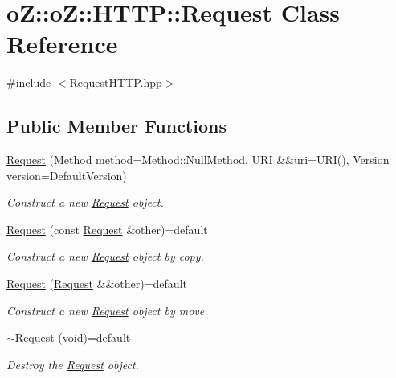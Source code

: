 \hypertarget{classo_z_1_1o_z_1_1_h_t_t_p_1_1_request}{}\section{oZ\+::oZ\+::H\+T\+TP\+::Request Class Reference}
\label{classo_z_1_1o_z_1_1_h_t_t_p_1_1_request}


{\ttfamily \#include $<$Request\+H\+T\+T\+P.\+hpp$>$}

\subsection*{Public Member Functions}
\begin{DoxyCompactItemize}
\item 
\mbox{\hyperlink{classo_z_1_1o_z_1_1_h_t_t_p_1_1_request_ac0740316198c643722554b1b25b1de9c}{Request}} (Method method=Method\+::\+Null\+Method, U\+RI \&\&uri=U\+RI(), Version version=Default\+Version)
\begin{DoxyCompactList}\small\item\em Construct a new \mbox{\hyperlink{classo_z_1_1o_z_1_1_h_t_t_p_1_1_request}{Request}} object. \end{DoxyCompactList}\item 
\mbox{\hyperlink{classo_z_1_1o_z_1_1_h_t_t_p_1_1_request_a0200643038d42ef71b06579ce9423e7f}{Request}} (const \mbox{\hyperlink{classo_z_1_1o_z_1_1_h_t_t_p_1_1_request}{Request}} \&other)=default
\begin{DoxyCompactList}\small\item\em Construct a new \mbox{\hyperlink{classo_z_1_1o_z_1_1_h_t_t_p_1_1_request}{Request}} object by copy. \end{DoxyCompactList}\item 
\mbox{\hyperlink{classo_z_1_1o_z_1_1_h_t_t_p_1_1_request_a37b5a62d0ae99aba94b2fc18ad8ef886}{Request}} (\mbox{\hyperlink{classo_z_1_1o_z_1_1_h_t_t_p_1_1_request}{Request}} \&\&other)=default
\begin{DoxyCompactList}\small\item\em Construct a new \mbox{\hyperlink{classo_z_1_1o_z_1_1_h_t_t_p_1_1_request}{Request}} object by move. \end{DoxyCompactList}\item 
\mbox{\hyperlink{classo_z_1_1o_z_1_1_h_t_t_p_1_1_request_a5d6857d241abfa036333dd12836824ea}{$\sim$\+Request}} (void)=default
\begin{DoxyCompactList}\small\item\em Destroy the \mbox{\hyperlink{classo_z_1_1o_z_1_1_h_t_t_p_1_1_request}{Request}} object. \end{DoxyCompactList}\item 

\end{DoxyCompactItemize}
